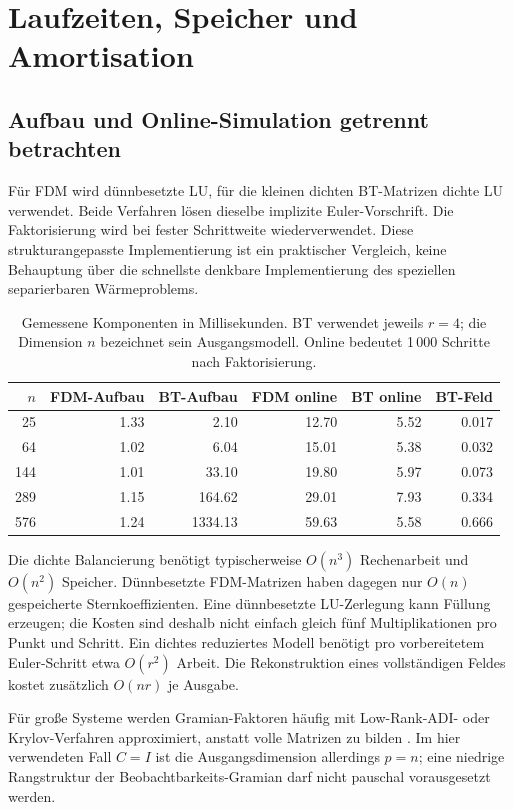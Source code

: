 \documentclass[11pt,a4paper]{article}
\begin{document}
\section{Laufzeiten, Speicher und Amortisation}
\subsection{Aufbau und Online-Simulation getrennt betrachten}
Für FDM wird dünnbesetzte LU, für die kleinen dichten BT-Matrizen dichte LU verwendet. Beide Verfahren lösen dieselbe implizite Euler-Vorschrift. Die Faktorisierung wird bei fester Schrittweite wiederverwendet. Diese strukturangepasste Implementierung ist ein praktischer Vergleich, keine Behauptung über die schnellste denkbare Implementierung des speziellen separierbaren Wärmeproblems.

\begin{table}[htbp]\centering\small
\caption{Gemessene Komponenten in Millisekunden. BT verwendet jeweils $r=4$; die Dimension $n$ bezeichnet sein Ausgangsmodell. Online bedeutet 1\,000 Schritte nach Faktorisierung.}
\begin{tabular}{rrrrrr}\toprule
$n$ & FDM-Aufbau & BT-Aufbau & FDM online & BT online & BT-Feld\\\midrule
25 & 1.33 & 2.10 & 12.70 & 5.52 & 0.017 \\
64 & 1.02 & 6.04 & 15.01 & 5.38 & 0.032 \\
144 & 1.01 & 33.10 & 19.80 & 5.97 & 0.073 \\
289 & 1.15 & 164.62 & 29.01 & 7.93 & 0.334 \\
576 & 1.24 & 1334.13 & 59.63 & 5.58 & 0.666 \\

\bottomrule\end{tabular}
\end{table}

Die dichte Balancierung benötigt typischerweise $O(n^3)$ Rechenarbeit und $O(n^2)$ Speicher. Dünnbesetzte FDM-Matrizen haben dagegen nur $O(n)$ gespeicherte Sternkoeffizienten. Eine dünnbesetzte LU-Zerlegung kann Füllung erzeugen; die Kosten sind deshalb nicht einfach gleich fünf Multiplikationen pro Punkt und Schritt. Ein dichtes reduziertes Modell benötigt pro vorbereitetem Euler-Schritt etwa $O(r^2)$ Arbeit. Die Rekonstruktion eines vollständigen Feldes kostet zusätzlich $O(nr)$ je Ausgabe.

Für große Systeme werden Gramian-Faktoren häufig mit Low-Rank-ADI- oder Krylov-Verfahren approximiert, anstatt volle Matrizen zu bilden \cite{benner2005,penzl}. Im hier verwendeten Fall $C=I$ ist die Ausgangsdimension allerdings $p=n$; eine niedrige Rangstruktur der Beobachtbarkeits-Gramian darf nicht pauschal vorausgesetzt werden.
\end{document}
